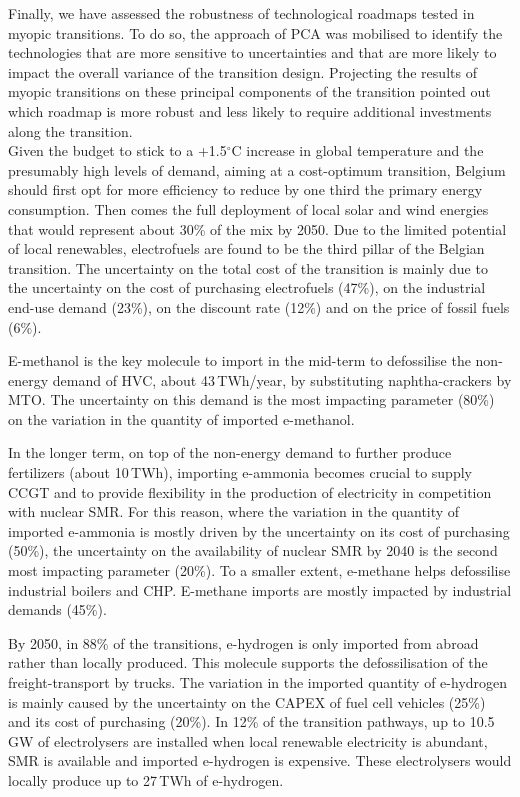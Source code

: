 Finally, we have assessed the robustness of technological roadmaps tested in myopic transitions. To do so, the approach of \acrfull{PCA} was mobilised to identify the technologies that are more sensitive to uncertainties and that are more likely to impact the overall variance of the transition design. Projecting the results of myopic transitions on these principal components of the transition pointed out which roadmap is more robust and less likely to require additional investments along the transition.\\

Given the  budget to stick to a +1.5$^{\circ}$C increase in global temperature and the presumably high levels of demand,  aiming at a cost-optimum transition, Belgium should first opt for more efficiency to reduce by one third the primary energy consumption. Then comes the full deployment of local solar and wind energies that would represent about 30\% of the mix by 2050. Due to the limited potential of local renewables, electrofuels are found to be the third pillar of the Belgian transition. The uncertainty on the total cost of the transition is mainly due to the uncertainty on the cost of purchasing electrofuels (47\%), on the industrial end-use demand (23\%), on the discount rate (12\%) and on the price of fossil fuels (6\%).

E-methanol is the key molecule to import in the mid-term to defossilise the non-energy demand of \acrfull{HVC}, about 43\,TWh/year, by substituting naphtha-crackers by \acrfull{MTO}. The uncertainty on this demand is the most impacting parameter (80\%) on the variation in the quantity of imported e-methanol. 

In the longer term, on top of the non-energy demand to further produce fertilizers (about 10\,TWh), importing e-ammonia becomes crucial to supply \acrfull{CCGT} and to provide flexibility in the production of electricity in competition with nuclear \acrfull{SMR}. For this reason, where the variation in the quantity of imported e-ammonia is mostly driven by the uncertainty on its cost of purchasing (50\%), the uncertainty on the availability of nuclear \gls{SMR} by 2040 is the second most impacting parameter (20\%). To a smaller extent, e-methane helps defossilise industrial boilers and \acrfull{CHP}. E-methane imports are mostly impacted by industrial demands (45\%). 

By 2050, in 88\% of the transitions, e-hydrogen is only imported from abroad rather than locally produced. This molecule supports the defossilisation of the freight-transport by trucks. The variation in the imported quantity of e-hydrogen is mainly caused by the uncertainty on the CAPEX of fuel cell vehicles (25\%) and its cost of purchasing (20\%). In 12\% of the transition pathways, up to 10.5\,GW of electrolysers are installed when local renewable electricity is abundant, \gls{SMR} is available and imported e-hydrogen is expensive. These electrolysers would locally produce up to 27\,TWh of e-hydrogen. 

